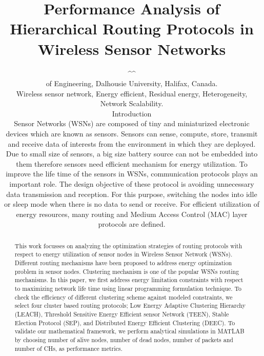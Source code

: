 \documentclass[journal]{IEEEtran}
\begin{document}
\title{Performance Analysis of Hierarchical Routing Protocols in Wireless Sensor Networks}


\author{^{\ddag}^{\Faculty of Engineering, Dalhousie University, Halifax, Canada.

     }

\maketitle

\begin{abstract}
\boldmath
This work focusses on analyzing the optimization strategies of routing protocols with respect to energy utilization of sensor nodes in Wireless Sensor Network (WSNs). Different routing mechanisms have been proposed to address energy optimization problem in sensor nodes. Clustering mechanism is one of the popular WSNs routing mechanisms. In this paper, we first address energy limitation constraints with respect to maximizing network life time using linear programming formulation technique. To check the efficiency of different clustering scheme against modeled constraints, we select four cluster based routing protocols; Low Energy Adaptive Clustering Hierarchy (LEACH), Threshold Sensitive Energy Efficient sensor Network (TEEN), Stable Election Protocol (SEP), and Distributed Energy Efficient Clustering (DEEC). To validate our mathematical framework, we perform analytical simulations in MATLAB by choosing number of alive nodes, number of dead nodes, number of packets and number of CHs, as performance metrics.
\end{abstract}

\begin{IEEEkeywords}
Wireless sensor network, Energy efficient, Residual energy, Heterogeneity, Network Scalability.
\end{IEEEkeywords}

\IEEEpeerreviewmaketitle
\section{Introduction}
 Sensor Networks (WSNs) are composed of tiny and miniaturized electronic devices which are known as sensors. Sensors can sense, compute, store, transmit and receive data of interests from the environment in which they are deployed. Due to small size of sensors, a big size battery source can not be embedded into them therefore sensors need efficient mechanism for energy utilization. To improve  the life time of the sensors in WSNs, communication protocols plays an important role. The design objective of these protocol is avoiding unnecessary data transmission and reception. For this purpose, switching the nodes into idle or sleep mode when there is no data to send or receive. For efficient utilization of energy resources, many routing and Medium Access Control (MAC) layer protocols are defined.

}
\end{document}

